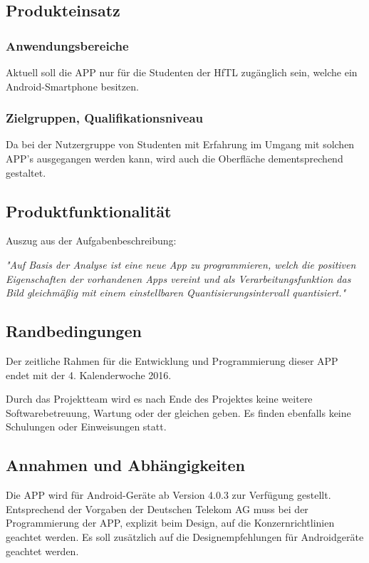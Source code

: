 \subsection{\textbf{Produkteinsatz}}

\subsubsection{Anwendungsbereiche}
Aktuell soll die APP nur für die Studenten der \acs{HfTL} zugänglich sein, welche ein Android-Smartphone besitzen. 

\subsubsection{Zielgruppen, Qualifikationsniveau}

Da bei der Nutzergruppe von Studenten mit Erfahrung im Umgang mit solchen APP's ausgegangen werden kann, wird auch die Oberfläche dementsprechend gestaltet.

\subsection{\textbf{Produktfunktionalität}}

Auszug aus der Aufgabenbeschreibung:

\textit{"Auf Basis der Analyse ist eine neue App zu programmieren,
welch die positiven Eigenschaften der vorhandenen Apps vereint und als Verarbeitungsfunktion
das Bild gleichmäßig mit einem einstellbaren Quantisierungsintervall quantisiert."} 

\subsection{\textbf{Randbedingungen}}

Der zeitliche Rahmen für die Entwicklung und Programmierung dieser APP endet mit der 4. Kalenderwoche 2016.

Durch das Projektteam wird es nach Ende des Projektes keine weitere Softwarebetreuung, Wartung oder der gleichen geben. Es finden ebenfalls keine Schulungen oder Einweisungen statt.

\subsection{\textbf{Annahmen und Abhängigkeiten}}

Die APP wird für Android-Geräte ab Version 4.0.3 zur Verfügung gestellt.
Entsprechend der Vorgaben der Deutschen Telekom AG muss bei der Programmierung der APP, explizit beim Design, auf die Konzernrichtlinien geachtet werden. Es soll zusätzlich auf die Designempfehlungen für Androidgeräte geachtet werden.

